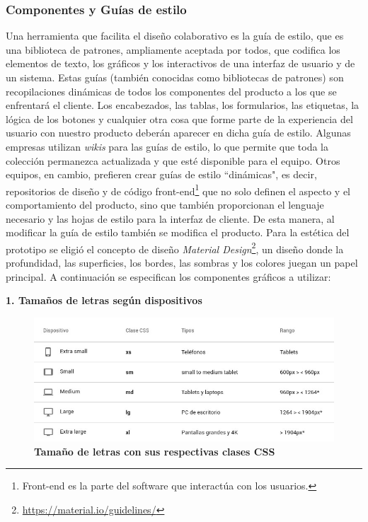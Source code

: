 \clearpage
\subsubsection{Componentes y Guías de estilo}
Una herramienta que facilita el diseño colaborativo es la guía de estilo, que es una biblioteca de patrones, ampliamente aceptada por todos, que codifica los elementos de texto, los gráficos y los interactivos de una interfaz de usuario y de un sistema. Estas guías (también conocidas como bibliotecas de patrones) son recopilaciones dinámicas de todos los componentes del producto a los que se enfrentará el cliente. Los encabezados, las tablas, los formularios, las etiquetas, la lógica de los botones y cualquier otra cosa que forme parte de la experiencia del usuario con nuestro producto deberán aparecer en dicha guía de estilo. Algunas empresas utilizan \textit{wikis} para las guías de estilo, lo que permite que toda la colección permanezca actualizada y que esté disponible para el equipo. Otros equipos, en cambio, prefieren crear guías de estilo ``dinámicas", es decir, repositorios de diseño y de código front-end\footnote{Front-end es la parte del software que interactúa con los usuarios.} que no solo definen el aspecto y el comportamiento del producto, sino que también proporcionan el lenguaje necesario y las hojas de estilo para la interfaz de cliente. De esta manera, al modificar la guía de estilo también se modifica el producto.
Para la estética del prototipo se eligió el concepto de diseño \textit{Material Design}\footnote{\url{https://material.io/guidelines/}}, un diseño donde la profundidad, las superficies, los bordes, las sombras y los colores juegan un papel principal. A continuación se especifican los componentes gráficos a utilizar:


\textbf{1. Tamaños de letras según dispositivos}
    \begin{figure}[h]
    \includegraphics[width=14cm]{Img/UX/guia1.jpg}
    \centering
    \caption{\textbf{ \footnotesize{Tamaño de letras con sus respectivas clases CSS}}}
\end{figure} 
    
